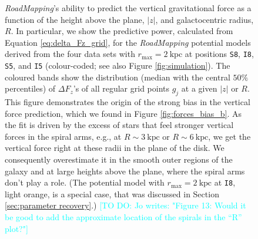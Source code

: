 \documentclass[iop,revtex4,numberedappendix,appendixfloats]{emulateapj}
\newcommand{\RM}{{\sl RoadMapping}}
\newcommand{\Jo}[1]{\textcolor{Cyan}{#1}}
\begin{document}
\begin{figure}[!htbp]
\centering
\caption{\RM{}'s ability to predict the vertical gravitational force as a function of the height above the plane, $|z|$, and galactocentric radius, $R$. In particular, we show the predictive power, calculated from Equation \eqref{eq:delta_Fz_grid}, for the \RM{} potential models derived from the four data sets with $r_\text{max}=2~\text{kpc}$ at positions \texttt{S8}, \texttt{I8}, \texttt{S5}, and \texttt{I5} (colour-coded; see also Figure \ref{fig:simulation}). The coloured bands show the distribution (median with the central $50\%$ percentiles) of $\Delta F_z$'s of all regular grid points $g_j$ at a given $|z|$ or $R$. This figure demonstrates the origin of the strong bias in the vertical force prediction, which we found in Figure \ref{fig:forces_bias_b}. As the fit is driven by the excess of stars that feel stronger vertical forces in the spiral arms, e.g., at $R\sim3~\text{kpc}$ or $R\sim6~\text{kpc}$, we get the vertical force right at these radii in the plane of the disk. We consequently overestimate it in the smooth outer regions of the galaxy and at large heights above the plane, where the spiral arms don't play a role. (The potential model with $r_\text{max}=2~\text{kpc}$ at \texttt{I8}, light orange, is a special case, that was discussed in Section \ref{sec:parameter recovery}.) \Jo{[TO DO: Jo writes: "Figure 13: Would it be good to add the approximate location of the
spirals in the “R” plot?"]}}
\label{fig:Fg_vs_z_and_R}
\end{figure}
\end{document}
